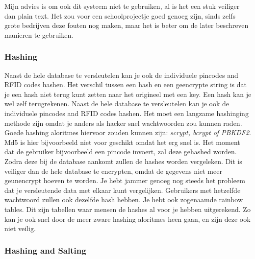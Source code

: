 \documentclass{article}
\begin{document}
Mijn advies is om ook dit systeem niet te gebruiken, al is het een stuk veiliger dan plain text.
Het zou voor een schoolprojectje goed genoeg zijn, sinds zelfs grote bedrijven deze fouten nog maken, maar het is beter om de later beschreven manieren te gebruiken.

\newpage

\subsubsection{Hashing}

Naast de hele database te versleutelen kan je ook de individuele pincodes and RFID codes hashen.
Het verschil tussen een hash en een ge\:encrypte string is dat je een hash niet terug kunt zetten naar het origineel met een key. 
Een hash kan je wel zelf terugrekenen.
Naast de hele database te versleutelen kan je ook de individuele pincodes and RFID codes hashen.
Het moet een langzame hashinging methode zijn omdat je anders als hacker snel wachtwoorden zou kunnen raden.
Goede hashing aloritmes hiervoor zouden kunnen zijn: \emph{scrypt, bcrypt of PBKDF2}.
Md5 is hier bijvoorbeeld niet voor geschikt omdat het erg snel is.
Het moment dat de gebruiker bijvoorbeeld een pincode invoert, zal deze gehashed worden.
Zodra deze bij de database aankomt zullen de hashes worden vergeleken.
Dit is veiliger dan de hele database te encrypten, omdat de gegevens niet meer geunencrypt hoeven te worden.
Je hebt jammer genoeg nog steeds het probleem dat je versleutende data met elkaar kunt vergelijken.
Gebruikers met hetzelfde wachtwoord zullen ook dezelfde hash hebben.
Je hebt ook zogenaamde rainbow tables.
Dit zijn tabellen waar mensen de hashes al voor je hebben uitgerekend.
Zo kan je ook snel door de meer zware hashing aloritmes heen gaan, en zijn deze ook niet veilig.

\hfill

\centerline{  }

\newpage

\subsubsection{Hashing and Salting}
\end{document}

